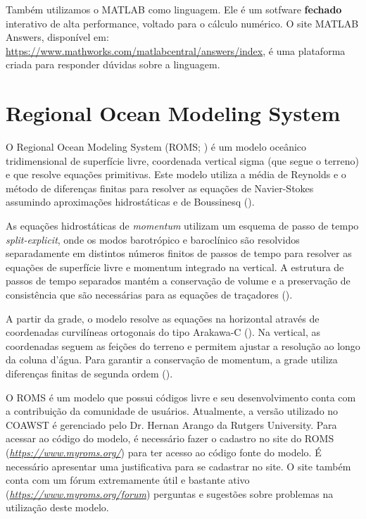 \noindent Também utilizamos o MATLAB como linguagem. Ele é um sotfware \textbf{fechado} interativo de alta performance, voltado para o 
          cálculo numérico. O site MATLAB Answers, disponível em: \textcolor{bleu_cite}{\href{https://www.mathworks.com/matlabcentral/answers/index}{https://www.mathworks.com/matlabcentral/answers/index}}, 
          é uma plataforma criada para responder dúvidas sobre a linguagem.





\section{Regional Ocean Modeling System}\label{romssecao}
\bigskip
\noindent O Regional Ocean Modeling System (ROMS; \cite{Shchepetkin2005}) é um modelo oceânico tridimensional de superfície livre, 
          coordenada vertical sigma (que segue o terreno) e que resolve equações primitivas. Este modelo utiliza a média de Reynolds 
          e o método de diferenças finitas para resolver as equações de Navier-Stokes assumindo aproximações hidrostáticas 
          e de Boussinesq (\cite{Haidvogel2008}).
\bigskip

\noindent As equações hidrostáticas de \textit{momentum} utilizam um esquema de passo de tempo \textit{split-explicit}, 
          onde os modos barotrópico e baroclínico são resolvidos separadamente em distintos números finitos de passos
          de tempo para resolver as equações de superfície livre e momentum integrado na vertical. A estrutura de passos
          de tempo separados mantém a conservação de volume e a preservação de consistência que são necessárias para as equações 
          de traçadores (\cite{Shchepetkin2005,Haidvogel2008}).
\bigskip

\noindent A partir da grade, o modelo resolve as equações na horizontal através de coordenadas curvilíneas ortogonais do 
          tipo Arakawa-C (\cite{Arakawa1977}). Na vertical, as coordenadas seguem as feições do terreno e permitem ajustar a 
          resolução ao longo da coluna d'água. Para garantir a conservação de momentum, a grade utiliza diferenças finitas de
          segunda ordem (\cite{Haidvogel2008}).
\bigskip

\noindent O ROMS é um modelo que possui códigos livre e seu desenvolvimento conta com a contribuição da comunidade de usuários.
          Atualmente, a versão utilizado no COAWST é gerenciado pelo Dr. Hernan Arango da Rutgers University. Para acessar ao 
          código do modelo, é necessário fazer o cadastro no site do ROMS 
          (\textcolor{bleu_cite}{\href{https://www.myroms.org/}{\textit{https://www.myroms.org/}}}) para ter acesso ao código 
          fonte do modelo. É necessário apresentar uma justificativa para se cadastrar no site. O site também conta com um fórum 
          extremamente útil e bastante ativo (\textcolor{bleu_cite}{\href{https://www.myroms.org/forum}{\textit{https://www.myroms.org/forum}}}) 
          perguntas e sugestões sobre problemas na utilização deste modelo.
\bigskip

